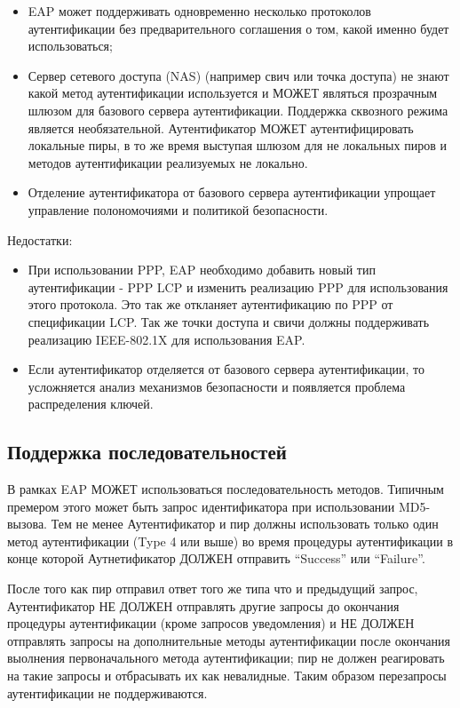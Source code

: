 \begin{itemize}
\item EAP может поддерживать одновременно несколько протоколов аутентификации без предварительного соглашения о том, какой именно будет использоваться;
\item Сервер сетевого доступа (NAS) (например свич или точка доступа) не знают какой метод аутентификации используется и МОЖЕТ являться прозрачным шлюзом для базового сервера аутентификации. Поддержка сквозного режима является необязательной. Аутентификатор МОЖЕТ аутентифицировать локальные пиры, в то же время выступая шлюзом для не локальных пиров и методов аутентификации реализуемых не локально.
\item Отделение аутентификатора от базового сервера аутентификации упрощает управление полономочиями и политикой безопасности.
\end{itemize}

Недостатки:

\begin{itemize}
\item При использовании PPP, EAP необходимо добавить новый тип аутентификации - PPP LCP и изменить реализацию PPP для использования этого протокола. Это так же откланяет аутентификацию по PPP от спецификации LCP. Так же точки доступа и свичи должны поддерживать реализацию IEEE-802.1X для использования EAP.
\item Если аутентификатор отделяется от базового сервера аутентификации, то усложняется анализ механизмов безопасности и появляется проблема распределения ключей.
\end{itemize}

\subsection{Поддержка последовательностей}

В рамках EAP МОЖЕТ использоваться последовательность методов. Типичным премером этого может быть запрос идентификатора при использовании MD5-вызова. Тем не менее Аутентификатор и пир должны использовать только один метод аутентификации (Type 4 или выше) во время процедуры аутентификации в конце которой Аутнетификатор ДОЛЖЕН отправить ``Success'' или ``Failure''.

После того как пир отправил ответ того же типа что и предыдущий запрос, Аутентификатор НЕ ДОЛЖЕН отправлять другие запросы до окончания процедуры аутентификации (кроме запросов уведомления) и НЕ ДОЛЖЕН отправлять запросы на дополнительные методы аутентификации после окончания выолнения первоначального метода аутентификации; пир не должен реагировать на такие запросы и отбрасывать их как невалидные. Таким образом перезапросы аутентификации не поддерживаются.

